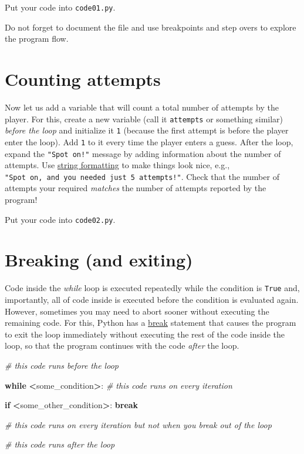 \documentclass[
]{book}
\newenvironment{Shaded}{\begin{snugshade}}{\end{snugshade}}
\newcommand{\CommentTok}[1]{\textcolor[rgb]{0.56,0.35,0.01}{\textit{#1}}}
\newcommand{\ControlFlowTok}[1]{\textcolor[rgb]{0.13,0.29,0.53}{\textbf{#1}}}
\newcommand{\NormalTok}[1]{#1}
\newcommand{\OperatorTok}[1]{\textcolor[rgb]{0.81,0.36,0.00}{\textbf{#1}}}
\begin{document}
Put your code into \texttt{code01.py}.

Do not forget to document the file and use breakpoints and step overs to explore the program flow.

\hypertarget{counting-attempts}{%
\section{Counting attempts}\label{counting-attempts}}

Now let us add a variable that will count a total number of attempts by the player. For this, create a new variable (call it \texttt{attempts} or something similar) \emph{before the loop} and initialize it \texttt{1} (because the first attempt is before the player enter the loop). Add \texttt{1} to it every time the player enters a guess. After the loop, expand the \texttt{"Spot\ on!"} message by adding information about the number of attempts. Use \protect\hyperlink{ux5cux23string-formatting}{string formatting} to make things look nice, e.g., \texttt{"Spot\ on,\ and\ you\ needed\ just\ 5\ attempts!"}. Check that the number of attempts your required \emph{matches} the number of attempts reported by the program!

Put your code into \texttt{code02.py}.

\hypertarget{break}{%
\section{Breaking (and exiting)}\label{break}}

Code inside the \emph{while} loop is executed repeatedly while the condition is \texttt{True} and, importantly, all of code inside is executed before the condition is evaluated again. However, sometimes you may need to abort sooner without executing the remaining code. For this, Python has a \href{https://docs.python.org/3/tutorial/controlflow.html\#break-and-continue-statements-and-else-clauses-on-loops}{break} statement that causes the program to exit the loop immediately without executing the rest of the code inside the loop, so that the program continues with the code \emph{after} the loop.

\begin{Shaded}
\begin{Highlighting}[]
\CommentTok{\# this code runs before the loop}

\ControlFlowTok{while} \OperatorTok{\textless{}}\NormalTok{some\_condition}\OperatorTok{\textgreater{}}\NormalTok{:}
  \CommentTok{\# this code runs on every iteration}
  
    \ControlFlowTok{if} \OperatorTok{\textless{}}\NormalTok{some\_other\_condition}\OperatorTok{\textgreater{}}\NormalTok{:}
        \ControlFlowTok{break}
  
  \CommentTok{\# this code runs on every iteration but not when you break out of the loop}

\CommentTok{\# this code runs after the loop}
\end{Highlighting}
\end{Shaded}
\end{document}
